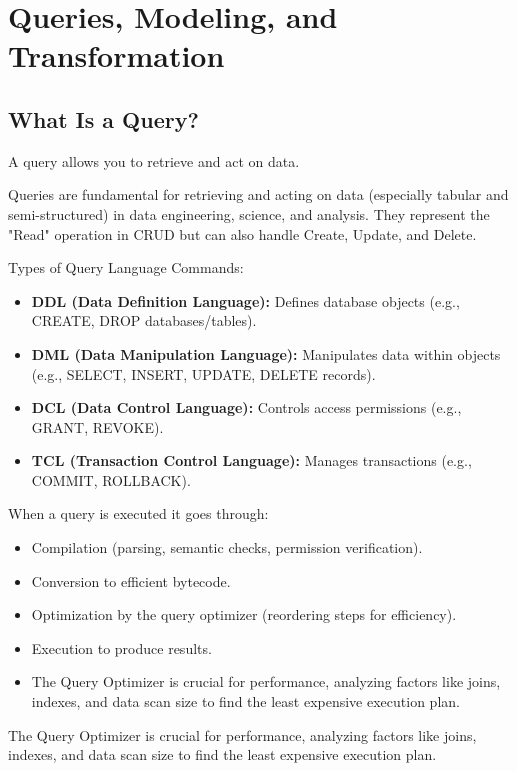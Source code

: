 \section{Queries, Modeling, and Transformation}



\subsection{What Is a Query?}
A query allows you to retrieve and act on data.

Queries are fundamental for retrieving and acting on
data (especially tabular and semi-structured) in data
engineering, science, and analysis. They represent the
"Read" operation in CRUD but can also handle Create,
Update, and Delete.

Types of Query Language Commands:
\begin{itemize}
    \item \textbf{DDL (Data Definition Language):}
    Defines database objects (e.g., CREATE, DROP
    databases/tables).

    \item \textbf{DML (Data Manipulation Language):}
    Manipulates data within objects (e.g., SELECT,
    INSERT, UPDATE, DELETE records).

    \item \textbf{DCL (Data Control Language):}
    Controls access permissions (e.g., GRANT, REVOKE).

    \item \textbf{TCL (Transaction Control Language):}
    Manages transactions (e.g., COMMIT, ROLLBACK).
\end{itemize}


When a query is executed it goes through:
\begin{itemize}
    \item Compilation
    (parsing, semantic checks, permission verification).
    
    \item Conversion to efficient bytecode.

    \item Optimization by the query optimizer
    (reordering steps for efficiency).

    \item Execution to produce results.

    \item The Query Optimizer is crucial for performance,
    analyzing factors like joins, indexes, and data scan
    size to find the least expensive execution plan.
\end{itemize}
The Query Optimizer is crucial for performance, analyzing
factors like joins, indexes, and data scan size to find
the least expensive execution plan.


